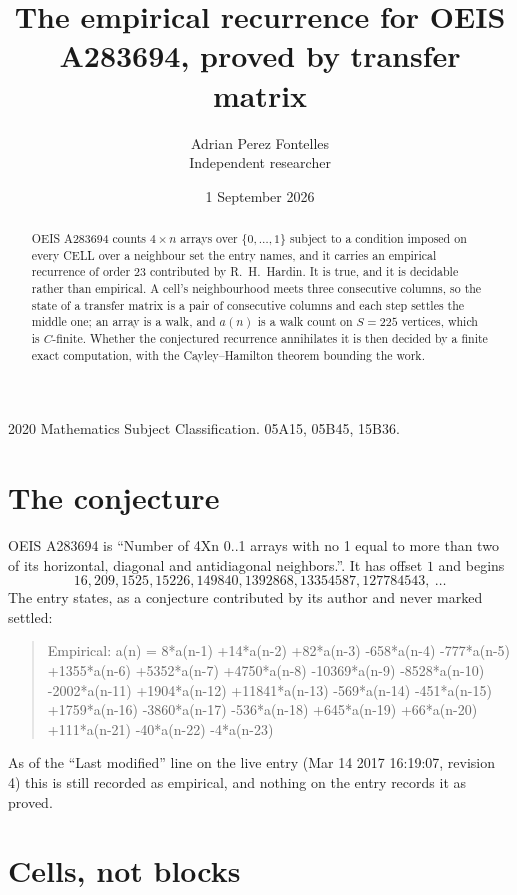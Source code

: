 \documentclass[11pt,a4paper]{article}
\title{The empirical recurrence for OEIS A283694, proved by transfer matrix}
\author{Adrian Perez Fontelles\\ \small Independent researcher}
\date{1 September 2026}
\theoremstyle{plain}
\theoremstyle{definition}
\begin{document}
\maketitle

\begin{abstract}
OEIS A283694 counts $4\times n$ arrays over $\{0,\dots,1\}$ subject to a condition imposed on
every CELL over a neighbour set the entry names, and it carries an empirical recurrence of
order $23$ contributed by R.~H.~Hardin. It is true, and it is decidable rather than
empirical. A cell's neighbourhood meets three consecutive columns, so the state of a transfer
matrix is a pair of consecutive columns and each step settles the middle one; an array is a
walk, and $a(n)$ is a walk count on $S=225$ vertices, which is $C$-finite. Whether the
conjectured recurrence annihilates it is then decided by a finite exact computation, with the
Cayley--Hamilton theorem bounding the work.
\end{abstract}

\noindent\small 2020 Mathematics Subject Classification. 05A15, 05B45, 15B36.\normalsize

\section{The conjecture}

OEIS A283694 is ``Number of 4Xn 0..1 arrays with no 1 equal to more than two of its horizontal, diagonal and antidiagonal neighbors.''. It has offset $1$ and begins
\[
16, 209, 1525, 15226, 149840, 1392868, 13354587, 127784543,\ \dots
\]
The entry states, as a conjecture contributed by its author and never marked settled:
\begin{quote}
Empirical: a(n) = 8*a(n-1) +14*a(n-2) +82*a(n-3) -658*a(n-4) -777*a(n-5) +1355*a(n-6) +5352*a(n-7) +4750*a(n-8) -10369*a(n-9) -8528*a(n-10) -2002*a(n-11) +1904*a(n-12) +11841*a(n-13) -569*a(n-14) -451*a(n-15) +1759*a(n-16) -3860*a(n-17) -536*a(n-18) +645*a(n-19) +66*a(n-20) +111*a(n-21) -40*a(n-22) -4*a(n-23)
\end{quote}
As of the ``Last modified'' line on the live entry (Mar 14 2017 16:19:07, revision 4) this is still
recorded as empirical, and nothing on the entry records it as proved.

\section{Cells, not blocks}
\end{document}

